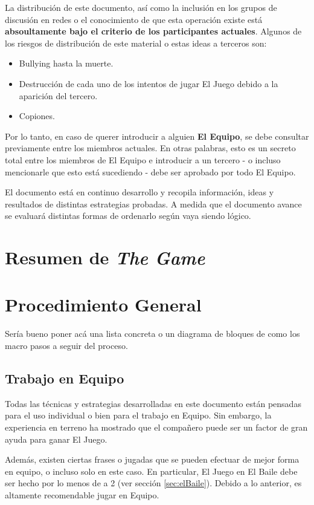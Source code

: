 \documentclass{article}
\begin{document}
La distribución de este documento, así como la inclusión en los grupos de discusión en redes o el conocimiento de que esta operación existe está \textbf{absoultamente bajo el criterio de los participantes actuales}. Algunos de los riesgos de distribución de este material o estas ideas a terceros son:

\begin{itemize}
\item Bullying hasta la muerte.
\item Destrucción de cada uno de los intentos de jugar El Juego debido a la aparición del tercero.
\item Copiones.
\end{itemize}

Por lo tanto, en caso de querer introducir a alguien \textbf{El Equipo}, se debe consultar previamente entre los miembros actuales. En otras palabras, esto es un secreto total entre los miembros de El Equipo e introducir a un tercero - o incluso mencionarle que esto está sucediendo - debe ser aprobado por todo El Equipo. 

El documento está en continuo desarrollo y recopila información, ideas y resultados de distintas estrategias probadas. A medida que el documento avance se evaluará distintas formas de ordenarlo según vaya siendo lógico.

\section{Resumen de \textit{The Game} \label{sec:TheGame}}
\section{Procedimiento General \label{sec:procedimientoGeneral}}
{\color{red} Sería bueno poner acá una lista concreta o un diagrama de bloques de como los macro pasos a seguir del proceso}.

\subsection{Trabajo en Equipo \label{ssec:trabajoEnEquipo}}

Todas las técnicas y estrategias desarrolladas en este documento están pensadas para el uso individual o bien para el trabajo en Equipo. Sin embargo, la experiencia en terreno ha mostrado que el compañero puede ser un factor de gran ayuda para ganar El Juego.

Además, existen ciertas frases o jugadas que se pueden efectuar de mejor forma en equipo, o incluso solo en este caso. En particular, El Juego en El Baile debe ser hecho por lo menos de a 2 (ver sección \ref{sec:elBaile}). Debido a lo anterior, es altamente recomendable jugar en Equipo.
\end{document}
